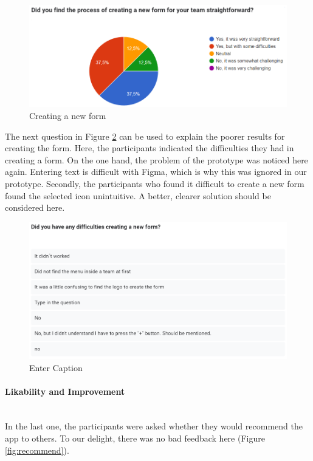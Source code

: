 \documentclass[11pt]{article}
\begin{document}
\begin{figure}[h!]
    \centering
    \includegraphics[width=0.9\linewidth]{figures/creating form.PNG}
    \caption{Creating a new form}
    \label{fig:creating form}
\end{figure}
The next question in Figure \ref{fig:comments form} can be used to explain the poorer results for creating the form. Here, the participants indicated the difficulties they had in creating a form. On the one hand, the problem of the prototype was noticed here again. Entering text is difficult with Figma, which is why this was ignored in our prototype. Secondly, the participants who found it difficult to create a new form found the selected icon unintuitive. A better, clearer solution should be considered here.
\begin{figure}[h!]
    \centering
    \includegraphics[width=0.9\linewidth]{figures/comments creating form.PNG}
    \caption{Enter Caption}
    \label{fig:comments form}
\end{figure}

\clearpage

\paragraph{Likability and Improvement} \mbox{}\\
In the last one, the participants were asked whether they would recommend the app to others. To our delight, there was no bad feedback here (Figure \ref{fig:recommend}).
\end{document}
